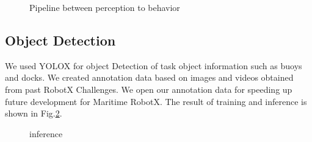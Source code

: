 \documentclass[lettersize,journal]{IEEEtran}
\begin{document}
\begin{figure}[htbp]
    \begin{center}
    \end{center}
    \caption{Pipeline between perception to behavior}
    \label{fig:behavior_flow}
  \end{figure}

\subsection{Object Detection}
We used  YOLOX\cite{YOLOX} for object Detection of task object information such as buoys and docks.
We created annotation data based on images and videos obtained from past RobotX Challenges.
We open our annotation data for speeding up future development for Maritime RobotX. \cite{dataset_annotations}
The result of training and inference is shown in Fig.\ref{fig:inference}.

\begin{figure}[h]
    \begin{center}
  \end{center}
  \caption{inference}
  \label{fig:inference}
\end{figure}
\end{document}
